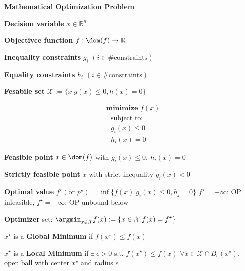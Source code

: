 \begin{sstTitleBox}[Plum]{\textbf{\large
			Mathematical Optimization Problem
		}}
	\begin{minipage}{0.70\linewidth}
		\begin{sstOnlyFrame}[Plum]
			\textbf{Decision variable} $x  \in \mathbb{R}^{n}$

			\textbf{Objectivce function} $f: \dom(f)\to\mathbb{R}$

			\textbf{Inequality constraints} $g_i$
			$\scriptstyle(i \in \#\text{constraints})$

			\textbf{Equality constraints} $h_i$
			$\scriptstyle(i \in \#\text{constraints})$

			\textbf{Fesabile set}
			$\mathcal{X}\!\!:=\!\!\{x|g(x)\!\!\le\!\!0,\!h(x)\!=\!0\}$
		\end{sstOnlyFrame}
	\end{minipage}
	\begin{minipage}{0.28\linewidth}
		\begin{sstFullFrame}[Plum]
			{\color{white}
				\vspace{-1mm}
				\[ \begin{aligned}
						 & \textbf{minimize }f(x)   \\
						 & \ \ \ \text{subject to:} \\
						 & \ \ \ g_i(x)  \le 0      \\
						 & \ \ \ h_i(x)  = 0
					\end{aligned} \]
				\vspace{-1mm}
			}
		\end{sstFullFrame}
	\end{minipage}

	\begin{sstOnlyFrame}[Plum]
		\textbf{Feasible point}
		$x\in\dom(f)$ with
		$g_i(x)\le 0,\ h_i(x)=0$

		\textbf{Strictly feasible point}
		$x$ with strict inequality
		$g_i(x)<0$

		\textbf{Optimal value}
		$f^\star (\text{or } p^\star)=
			\inf\{f(x)|
			g_i(x)\le0,h_j=0 \}$
		$f^\star=+\infty$: OP infeasible,
		$f^\star=-\infty$: OP unbound below

		\textbf{Optimizer}
		set:
		$\argmin_{x \in \mathcal{X}} f(x):=
			\{ x\in\mathcal{X}|f(x)=f^\star\}$
	\end{sstOnlyFrame}

	\begin{sstOnlyFrame}[Plum]
		$x^\star$ is a \textbf{Global Minimum} if $f(x^\star)\leq f(x)$

		$x^\star$ is a \textbf{Local Minimum} if
		$\exists\ \epsilon > 0$ s.t.
		$f(x^\star)\leq f(x)$
		$\forall x \in \mathcal{X} \cap B_\epsilon(x^\star)$,
		open ball with center $x^\star$ and radius $\epsilon$
	\end{sstOnlyFrame}
\end{sstTitleBox}
